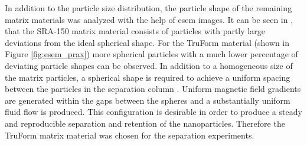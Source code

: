 In addition to the particle size distribution, the particle shape of the remaining matrix materials was analyzed with the help of \gls{esem} images. It can be seen in \cite{AndreMaster}, that the SRA-150 matrix material consists of particles with partly large deviations from the ideal spherical shape. For the TruForm material (shown in Figure \ref{fig:esem_prax}) more spherical particles with a much lower percentage of deviating particle shapes can be observed. In addition to a homogeneous size of the matrix particles, a spherical shape is required to achieve a uniform spacing between the particles in the separation column \cite{miltenyi1997magnetic}. Uniform magnetic field gradients are generated within the gaps between the spheres and a substantially uniform fluid flow is produced. This configuration is desirable in order to produce a steady and reproducible separation and retention of the nanoparticles. Therefore the TruForm matrix material was chosen for the separation experiments.          

